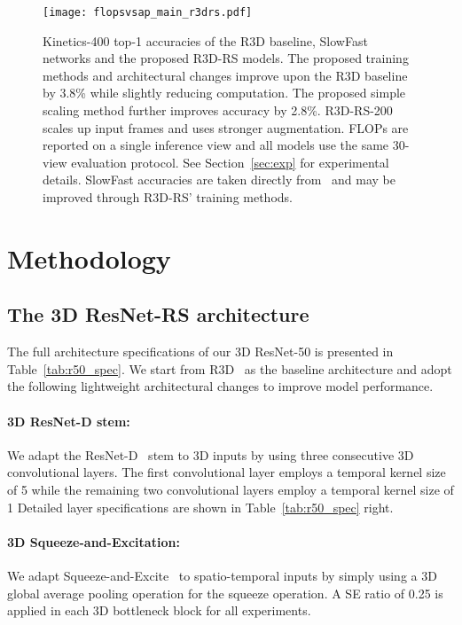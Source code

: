 \documentclass{article} \usepackage{iclr2021_conference,times}
\begin{document}
\begin{figure}[t]
  \centering
  \texttt{[image: flopsvsap\_main\_r3drs.pdf]}
\caption{\small{
Kinetics-400 top-1 accuracies of the R3D baseline, SlowFast networks and the proposed R3D-RS models.
The proposed training methods and architectural changes improve upon the R3D baseline by 3.8\% while slightly reducing computation.
The proposed simple scaling method further improves accuracy by 2.8\%.
R3D-RS-200 scales up input frames and uses stronger augmentation. 
FLOPs are reported on a single inference view and all models use the same 30-view evaluation protocol. 
See Section~\ref{sec:exp} for experimental details. 
SlowFast accuracies are taken directly from~\cite{Feichtenhofer2019SlowFastNF} and may be improved through R3D-RS' training methods.
}}
\label{fig:page1_fig}
\vspace{-0mm}
\end{figure}


\section{Methodology}


\subsection{The 3D ResNet-RS architecture}
The full architecture specifications of our 3D ResNet-50 is presented in Table~\ref{tab:r50_spec}.
We start from R3D~\cite{qian2021spatiotemporal} as the baseline architecture and adopt the following lightweight architectural changes to improve model performance.

\paragraph{3D ResNet-D stem:} We adapt the ResNet-D~\cite{He2019BagOT} stem to 3D inputs by using three consecutive 3D convolutional layers.
The first convolutional layer employs a temporal kernel size of 5 while the remaining two convolutional layers employ a temporal kernel size of 1
Detailed layer specifications are shown in Table~\ref{tab:r50_spec} right. 

\paragraph{3D Squeeze-and-Excitation:}
We adapt Squeeze-and-Excite~\cite{Hu2018SqueezeandExcitationN} to spatio-temporal inputs by simply using a 3D global average pooling operation for the squeeze operation.
A SE ratio of 0.25 is applied in each 3D bottleneck block for all experiments. 
\end{document}
